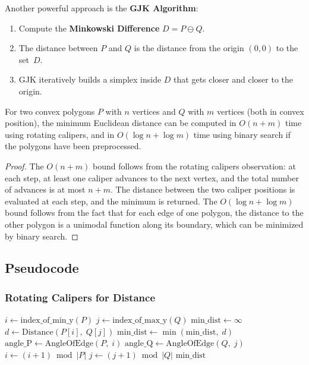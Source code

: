 Another powerful approach is the \textbf{GJK Algorithm}:
\begin{enumerate}
    \item Compute the \textbf{Minkowski Difference} $D = P \ominus Q$.
    \item The distance between $P$ and $Q$ is the distance from the origin $(0,0)$ to the set~$D$.
    \item GJK iteratively builds a simplex inside $D$ that gets closer and closer to the origin.
\end{enumerate}

\begin{theorem}\label{thm:convex_dist}
For two convex polygons $P$ with $n$ vertices and $Q$ with $m$ vertices (both in convex position), the minimum Euclidean distance can be computed in $O(n + m)$ time using rotating calipers, and in $O(\log n + \log m)$ time using binary search if the polygons have been preprocessed.
\end{theorem}

\begin{proof}
The $O(n + m)$ bound follows from the rotating calipers observation: at each step, at least one caliper advances to the next vertex, and the total number of advances is at most $n + m$. The distance between the two caliper positions is evaluated at each step, and the minimum is returned. The $O(\log n + \log m)$ bound follows from the fact that for each edge of one polygon, the distance to the other polygon is a unimodal function along its boundary, which can be minimized by binary search.
\end{proof}

\subsection{Pseudocode}

\subsubsection*{Rotating Calipers for Distance}
\begin{algorithm}[ht]
\label{alg:convex_distance}
\begin{algorithmic}[1]
    \State $i \gets \text{index\_of\_min\_y}(P)$
    \State $j \gets \text{index\_of\_max\_y}(Q)$
    \State $\text{min\_dist} \gets \infty$
        \State $d \gets \text{Distance}(P[i],\; Q[j])$
        \State $\text{min\_dist} \gets \min(\text{min\_dist},\; d)$
        \State $\text{angle\_P} \gets \text{AngleOfEdge}(P,\; i)$
        \State $\text{angle\_Q} \gets \text{AngleOfEdge}(Q,\; j)$
            \State $i \gets (i + 1) \bmod |P|$
        \Else
            \State $j \gets (j + 1) \bmod |Q|$
        \EndIf
    \EndFor
    \State \Return $\text{min\_dist}$
\EndFunction
\end{algorithmic}
\end{algorithm}

